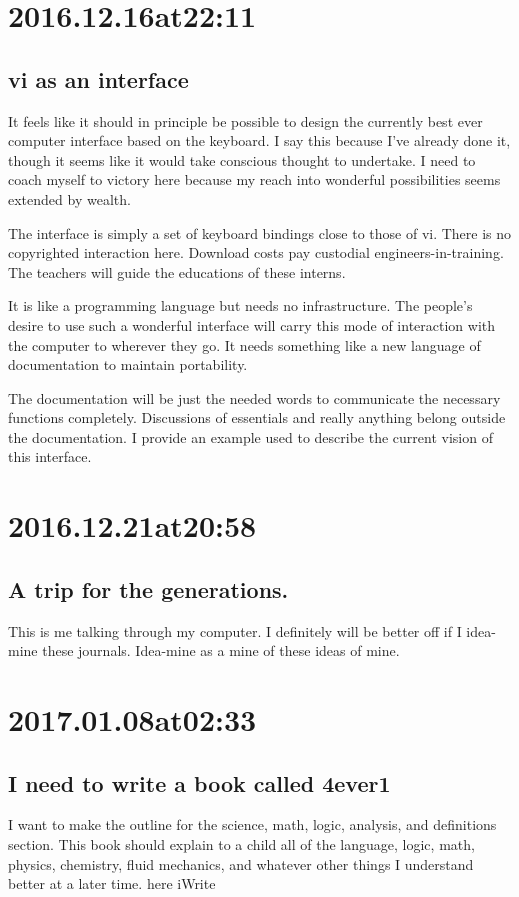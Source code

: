 \section*{ 2016.12.16at22:11 }
\subsection*{ vi as an interface }
It feels like it should in principle be possible to design the currently best ever computer interface based on the keyboard.  
I say this because I've already done it, though it seems like it would take conscious thought to undertake.
I need to coach myself to victory here because my reach into wonderful possibilities seems extended by wealth.

The interface is simply a set of keyboard bindings close to those of vi.
There is no copyrighted interaction here.
Download costs pay custodial engineers-in-training.
The teachers will guide the educations of these interns.

It is like a programming language but needs no infrastructure.
The people's desire to use such a wonderful interface will carry this mode of interaction with the computer to wherever they go.
It needs something like a new language of documentation to maintain portability.

The documentation will be just the needed words to communicate the necessary functions completely. Discussions of essentials and really anything belong outside the documentation. I provide an example used to describe the current vision of this interface.

\section*{ 2016.12.21at20:58 }
\subsection*{ A trip for the generations. }
This is me talking through my computer. I definitely will be better off if I idea-mine these journals. Idea-mine as a mine of these ideas of mine.

\section*{ 2017.01.08at02:33 }
\subsection*{ I need to write a book called 4ever1 }
I want to make the outline for the science, math, logic, analysis, and definitions section.
This book should explain to a child all of the language, logic, math, physics, chemistry, fluid mechanics, and whatever other things I understand better at a later time.
here iWrite

